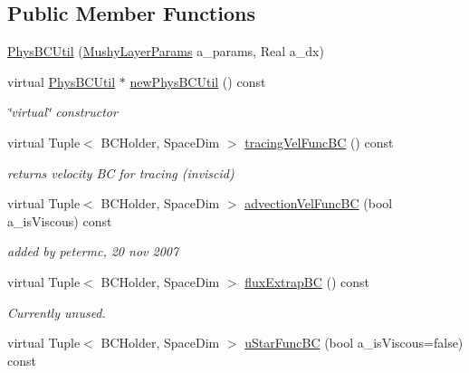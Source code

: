 \subsection*{Public Member Functions}
\begin{DoxyCompactItemize}
\item 
\hyperlink{class_phys_b_c_util_a08574a3a8d645947c3914ef6eb56694f}{Phys\-B\-C\-Util} (\hyperlink{class_mushy_layer_params}{Mushy\-Layer\-Params} a\-\_\-params, Real a\-\_\-dx)
\item 
\hypertarget{class_phys_b_c_util_a499c4b2427896f35a2b4c4b857d17b89}{virtual \hyperlink{class_phys_b_c_util}{Phys\-B\-C\-Util} $\ast$ \hyperlink{class_phys_b_c_util_a499c4b2427896f35a2b4c4b857d17b89}{new\-Phys\-B\-C\-Util} () const }\label{class_phys_b_c_util_a499c4b2427896f35a2b4c4b857d17b89}

\begin{DoxyCompactList}\small\item\em \char`\"{}virtual\char`\"{} constructor \end{DoxyCompactList}\item 
virtual Tuple$<$ B\-C\-Holder, Space\-Dim $>$ \hyperlink{class_phys_b_c_util_ad86270197f828321cffe7c8f2b9d9110}{tracing\-Vel\-Func\-B\-C} () const 
\begin{DoxyCompactList}\small\item\em returns velocity B\-C for tracing (inviscid) \end{DoxyCompactList}\item 
virtual Tuple$<$ B\-C\-Holder, Space\-Dim $>$ \hyperlink{class_phys_b_c_util_a5702e30d8bc08c378544213430cabf4c}{advection\-Vel\-Func\-B\-C} (bool a\-\_\-is\-Viscous) const 
\begin{DoxyCompactList}\small\item\em added by petermc, 20 nov 2007 \end{DoxyCompactList}\item 
\hypertarget{class_phys_b_c_util_a525b2443f35d2fc7574cb13782d7cc67}{virtual Tuple$<$ B\-C\-Holder, Space\-Dim $>$ \hyperlink{class_phys_b_c_util_a525b2443f35d2fc7574cb13782d7cc67}{flux\-Extrap\-B\-C} () const }\label{class_phys_b_c_util_a525b2443f35d2fc7574cb13782d7cc67}

\begin{DoxyCompactList}\small\item\em Currently unused. \end{DoxyCompactList}\item 
\hypertarget{class_phys_b_c_util_abb7e75548708a66c6ac30b64d2461ab3}{virtual Tuple$<$ B\-C\-Holder, Space\-Dim $>$ \hyperlink{class_phys_b_c_util_abb7e75548708a66c6ac30b64d2461ab3}{u\-Star\-Func\-B\-C} (bool a\-\_\-is\-Viscous=false) const }\label{class_phys_b_c_util_abb7e75548708a66c6ac30b64d2461ab3}


\end{DoxyCompactItemize}
